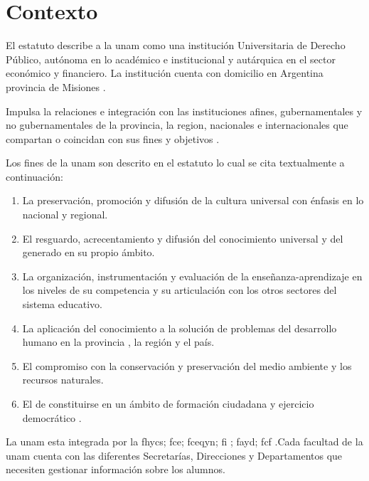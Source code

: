 \section{Contexto}

% 

El estatuto describe a la \gls{unam} como una institución Universitaria de Derecho Público,
autónoma en lo académico e institucional y
autárquica en el sector económico y financiero. La institución 
cuenta con domicilio en 
Argentina provincia de Misiones \cite[]{estatuto}. 

Impulsa la relaciones e integración con las instituciones afines,
gubernamentales y no gubernamentales de la provincia, la region,
nacionales e internacionales que compartan o coincidan con sus fines 
y objetivos \cite[]{estatuto}.

Los fines de la \gls{unam} son descrito en el estatuto lo cual se
cita textualmente a continuación:

\begin{enumerate}
\item La preservación, promoción y difusión de la cultura universal con énfasis en lo nacional y
regional.
\item El resguardo, acrecentamiento y difusión del conocimiento universal y del generado en su
propio ámbito.
\item La organización, instrumentación y evaluación de la enseñanza-aprendizaje en los niveles de su
competencia y su articulación con los otros sectores del sistema educativo.
\item La aplicación del conocimiento a la solución de problemas del desarrollo humano en la provincia
, la región y el país.
\item El compromiso con la conservación y preservación del medio ambiente y los recursos naturales.
\item El de constituirse en un ámbito de formación ciudadana y ejercicio democrático \cite[]{estatuto}.

\end{enumerate}

La \gls{unam} esta integrada por la \gls{fhycs}; \gls{fce}; \gls{fceqyn}; \gls{fi} ; \gls{fayd};
\gls{fcf} 
\cite[]{estatuto}.Cada facultad de la \gls{unam} cuenta con las diferentes  Secretarías, Direcciones y Departamentos que necesiten gestionar información 
sobre los alumnos.

